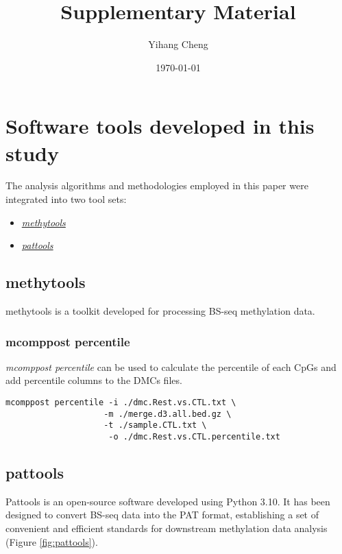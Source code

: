\documentclass[12pt,letterpaper]{article}
\title{Supplementary Material}
\author{Yihang Cheng}
\date{\today}
\begin{document}
\maketitle
\newpage
\tableofcontents
\newpage
\section{Software tools developed in this study}\label{sec:software-develope}
The analysis algorithms and methodologies employed in this paper were integrated into two tool sets:

\begin{itemize}
    \item  \href{https://github.com/hcyvan/epiLungCancer/tree/main/methytools}{\textit{methytools}}
    \item \href{https://github.com/hcyvan/pattools}{\textit{pattools}}
\end{itemize}

\subsection{methytools}\label{sec:software-develope-methytools}

methytools is a toolkit developed for processing BS-seq methylation data.

\subsubsection{mcomppost percentile}

\emph{mcomppost percentile} can be used to calculate the percentile of each CpGs and add percentile columns to the DMCs files.

\begin{verbatim}
mcomppost percentile -i ./dmc.Rest.vs.CTL.txt \
                    -m ./merge.d3.all.bed.gz \
                    -t ./sample.CTL.txt \
                     -o ./dmc.Rest.vs.CTL.percentile.txt
\end{verbatim}

\subsection{pattools}\label{sec:software-develope-pattools}

Pattools is an open-source software developed using Python 3.10. It has been designed to convert
BS-seq data into the PAT format\cite{Loyfer2024.05.08.593132}, establishing a set of convenient
and efficient standards for downstream methylation data analysis (Figure \ref*{fig:pattools}). 
\end{document}
